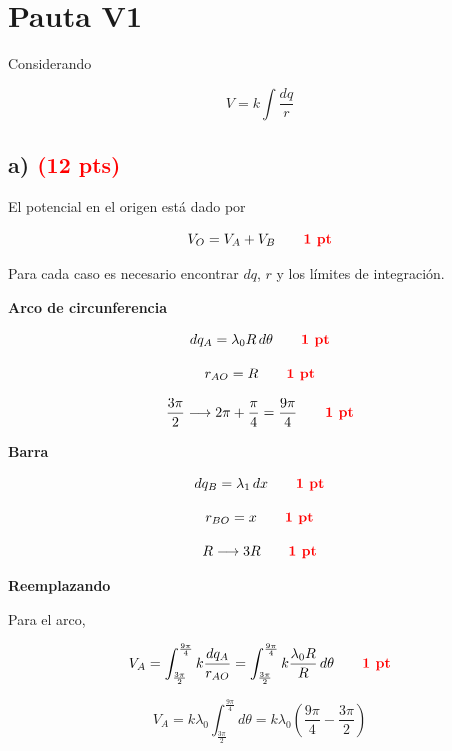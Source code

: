 \documentclass[12pt]{article}
\begin{document}
\newpage


\section*{Pauta V1}

Considerando

\[
V=k\int\frac{dq}{r}
\]

\subsection*{a) \hfill \textcolor{red}{\textbf{(12 pts)}}}

El potencial en el origen está dado por

\[
V_O=V_A+V_B
\qquad
\textcolor{red}{\textbf{1 pt}}
\]

Para cada caso es necesario encontrar $dq$, $r$ y los límites de integración.

\vspace{0.3cm}

\textbf{Arco de circunferencia}

\[
dq_A=\lambda_0R\,d\theta
\qquad
\textcolor{red}{\textbf{1 pt}}
\]

\[
r_{AO}=R
\qquad
\textcolor{red}{\textbf{1 pt}}
\]

\[
\frac{3\pi}{2}
\longrightarrow
2\pi+\frac{\pi}{4}
=
\frac{9\pi}{4}
\qquad
\textcolor{red}{\textbf{1 pt}}
\]

\vspace{0.3cm}

\textbf{Barra}

\[
dq_B
=
\lambda_1\,dx
\qquad
\textcolor{red}{\textbf{1 pt}}
\]

\[
r_{BO}=x
\qquad
\textcolor{red}{\textbf{1 pt}}
\]

\[
R\longrightarrow3R
\qquad
\textcolor{red}{\textbf{1 pt}}
\]

\vspace{0.4cm}

\textbf{Reemplazando}

Para el arco,

\[
V_A
=
\int_{\frac{3\pi}{2}}^{\frac{9\pi}{4}}
k\frac{dq_A}{r_{AO}}
=
\int_{\frac{3\pi}{2}}^{\frac{9\pi}{4}}
k\frac{\lambda_0R}{R}\,d\theta
\qquad
\textcolor{red}{\textbf{1 pt}}
\]

\[
V_A
=
k\lambda_0
\int_{\frac{3\pi}{2}}^{\frac{9\pi}{4}}
d\theta
=
k\lambda_0
\left(
\frac{9\pi}{4}-\frac{3\pi}{2}
\right)
\]
\end{document}
